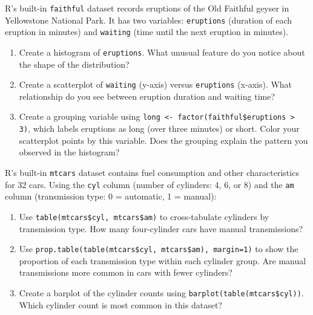 \begin{exercise}
R's built-in \lstinline{faithful} dataset records eruptions of the Old Faithful
geyser in Yellowstone National Park. It has two variables: \lstinline{eruptions}
(duration of each eruption in minutes) and \lstinline{waiting} (time until the
next eruption in minutes).
\begin{enumerate}
\item Create a histogram of \lstinline{eruptions}. What unusual feature do you
notice about the shape of the distribution?
\item Create a scatterplot of \lstinline{waiting} (y-axis) versus
\lstinline{eruptions} (x-axis). What relationship do you see between eruption
duration and waiting time?
\item Create a grouping variable using
\lstinline{long <- factor(faithful$eruptions > 3)}, which labels eruptions as
long (over three minutes) or short. Color your scatterplot points by this
variable. Does the grouping explain the pattern you observed in the histogram?
\end{enumerate}
\end{exercise}

\begin{exercise}
R's built-in \lstinline{mtcars} dataset contains fuel consumption and other
characteristics for 32 cars. Using the \lstinline{cyl} column (number of
cylinders: 4, 6, or 8) and the \lstinline{am} column (transmission type:
0 = automatic, 1 = manual):
\begin{enumerate}
\item Use \lstinline{table(mtcars$cyl, mtcars$am)} to cross-tabulate cylinders
by transmission type. How many four-cylinder cars have manual transmissions?
\item Use \lstinline{prop.table(table(mtcars$cyl, mtcars$am), margin=1)} to
show the proportion of each transmission type within each cylinder group.
Are manual transmissions more common in cars with fewer cylinders?
\item Create a barplot of the cylinder counts using
\lstinline{barplot(table(mtcars$cyl))}. Which cylinder count is most common in
this dataset?
\end{enumerate}
\end{exercise}

